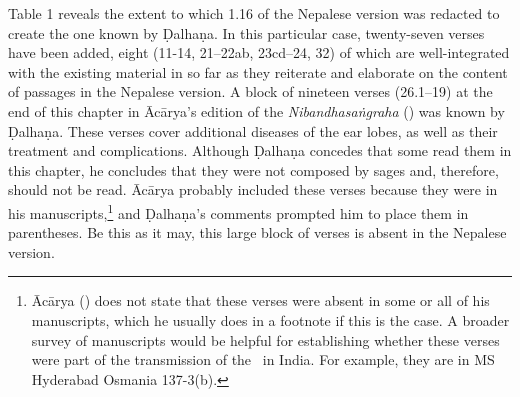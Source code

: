 Table 1 reveals the extent to which 1.16 of the Nepalese version was redacted to create the one known by Ḍalhaṇa. In this particular case, twenty-seven verses have been added, eight (11-14, 21–22ab, 23cd–24, 32) of which are well-integrated with the existing material in so far as they reiterate and elaborate on the content of passages in the Nepalese version. A block of nineteen verses (26.1–19) at the end of this chapter in Ācārya's edition of the \emph{Nibandhasaṅgraha} (\cite[80]{vulgate}) was known by Ḍalhaṇa. These verses cover additional diseases of the ear lobes, as well as their treatment and complications. Although Ḍalhaṇa concedes that some read them in this chapter, he concludes that they were not composed by sages and, therefore, should not be read. Ācārya probably included these verses because they were in his manuscripts,\footnote{Ācārya (\cite[80]{vulgate}) does not state that these verses were absent in some or all of his manuscripts, which he usually does in a footnote if this is the case. A broader survey of manuscripts would be helpful for establishing whether these verses were part of the transmission of the \SS\ in India. For example, they are in MS Hyderabad Osmania 137-3(b).} and Ḍalhaṇa's comments prompted him to place them in parentheses. Be this as it may, this large block of verses is absent in the Nepalese version. 

